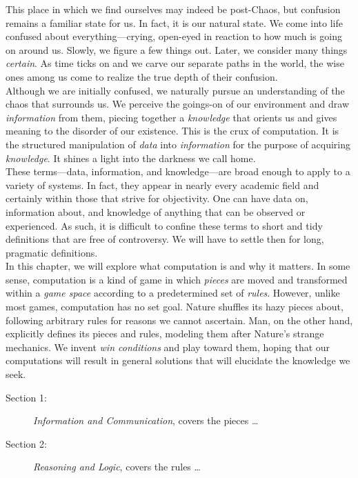 This place in which we find ourselves may indeed be post-Chaos, but confusion remains a familiar state for us. In fact, it is our natural state. We come into life confused about everything---crying, open-eyed in reaction to how much is going on around us. Slowly, we figure a few things out. Later, we consider many things \textit{certain}. As time ticks on and we carve our separate paths in the world, the wise ones among us come to realize the true depth of their confusion. \\

Although we are initially confused, we naturally pursue an understanding of the chaos that surrounds us. We perceive the goings-on of our environment and draw \textit{information} from them, piecing together a \textit{knowledge} that orients us and gives meaning to the disorder of our existence. This is the crux of computation. It is the structured manipulation of \textit{data} into \textit{information} for the purpose of acquiring \textit{knowledge}. It shines a light into the darkness we call home. \\

These terms---data, information, and knowledge---are broad enough to apply to a variety of systems. In fact, they appear in nearly every academic field and certainly within those that strive for objectivity. One can have data on, information about, and knowledge of anything that can be observed or experienced. As such, it is difficult to confine these terms to short and tidy definitions that are free of controversy. We will have to settle then for long, pragmatic definitions. \\

In this chapter, we will explore what computation is and why it matters. In some sense, computation is a kind of game in which \textit{pieces} are moved and transformed within a \textit{game space} according to a predetermined set of \textit{rules}. However, unlike most games, computation has no set goal. Nature shuffles its hazy pieces about, following arbitrary rules for reasons we cannot ascertain. Man, on the other hand, explicitly defines its pieces and rules, modeling them after Nature's strange mechanics. We invent \textit{win conditions} and play toward them, hoping that our computations will result in general solutions that will elucidate the knowledge we seek. \\

\begin{description}
	\item[Section 1:] \textit{Information and Communication}, covers the pieces \dots
	\item[Section 2:] \textit{Reasoning and Logic}, covers the rules \dots \\
\end{description}

